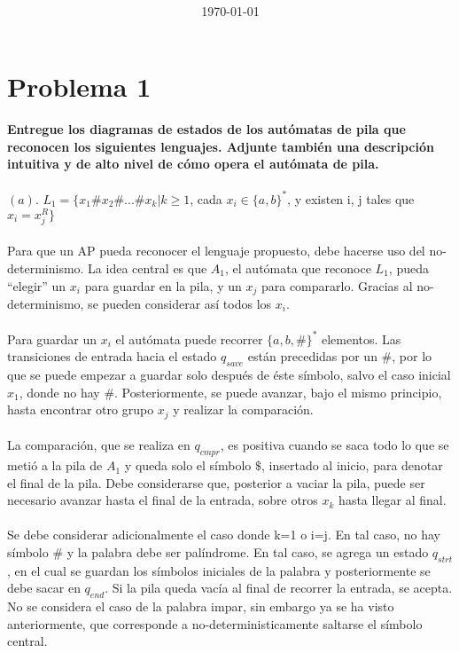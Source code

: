 \documentclass[spanish]{article}
\title{\task \\ {\normalsize \class \\ \institution \\}}
\author{\me}
\date{\today}
\begin{document}
\maketitle
\newpage
\tableofcontents
\newpage

\section{Problema 1}
\textbf{Entregue los diagramas de estados de los autómatas de pila que reconocen los siguientes lenguajes. Adjunte también una descripción intuitiva y de alto nivel de cómo opera el autómata de pila.}
\\\\
$(a)$. $L_1 = \{x_1\#x_2\#...\#x_k | k\geq1$, cada $x_i\in\{a,b\}^*$, y existen i, j tales que $x_i=x_j^R\}$
\\\\
Para que un AP pueda reconocer el lenguaje propuesto, debe hacerse uso del no-determinismo. La idea central es que $A_1$, el autómata que reconoce $L_1$, pueda ``elegir'' un $x_i$ para guardar en la pila, y un $x_j$ para compararlo. Gracias al no-determinismo, se pueden considerar así todos los $x_i$.
\\\\
Para guardar un $x_i$ el autómata puede recorrer $\{a,b,\#\}^*$ elementos. Las transiciones de entrada hacia el estado $q_{save}$ están precedidas por un $\#$, por lo que se puede empezar a guardar solo después de éste símbolo, salvo el caso inicial $x_1$, donde no hay $\#$. Posteriormente, se puede avanzar, bajo el mismo principio, hasta encontrar otro grupo $x_j$ y realizar la comparación. 
\\\\
La comparación, que se realiza en $q_{cmpr}$, es positiva cuando se saca todo lo que se metió a la pila de $A_1$ y queda solo el símbolo $\$$, insertado al inicio, para denotar el final de la pila. Debe considerarse que, posterior a vaciar la pila, puede ser necesario avanzar hasta el final de la entrada, sobre otros $x_k$ hasta llegar al final.
\\\\
Se debe considerar adicionalmente el caso donde k=1 o i=j. En tal caso, no hay símbolo $\#$ y la palabra debe ser palíndrome. En tal caso, se agrega un estado $q_{strt}$, en el cual se guardan los símbolos iniciales de la palabra y posteriormente se debe sacar en $q_{end}$. Si la pila queda vacía al final de recorrer la entrada, se acepta. No se considera el caso de la palabra impar, sin embargo ya se ha visto anteriormente, que corresponde a no-deterministicamente saltarse el símbolo central.
\end{document}
